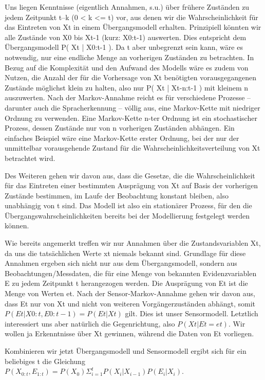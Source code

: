 Uns liegen Kenntnisse (eigentlich Annahmen, s.u.) über frühere Zuständen zu jedem Zeitpunkt t–k (0 < k <= t) vor, aus denen wir die Wahrscheinlichkeit für das Eintreten von Xt in einem Übergangsmodell erhalten.
Prinzipiell könnten wir alle Zustände von X0 bis Xt-1 (kurz: X0:t‑1) auswerten.
Dies entspricht dem Übergangsmodell P( Xt | X0:t-1 ).
Da t aber unbegrenzt sein kann, wäre es notwendig, nur eine endliche Menge an vorherigen Zuständen zu betrachten.
In Bezug auf die Komplexität und den Aufwand des Modells wäre es zudem von Nutzen, die Anzahl der für die Vorhersage von Xt benötigten vorausgegangenen Zustände möglichst klein zu halten, also nur P( Xt | Xt-n:t-1 ) mit kleinem n auszuwerten.
Nach der Markov-Annahme reicht es für verschiedene Prozesse – darunter auch die Spracherkennung – völlig aus, eine Markov-Kette mit niedriger Ordnung zu verwenden.
Eine Markov-Kette n-ter Ordnung ist ein stochastischer Prozess, dessen Zustände nur von n vorherigen Zuständen abhängen.
Ein einfaches Beispiel wäre eine Markov-Kette erster Ordnung, bei der nur der unmittelbar vorausgehende Zustand für die Wahrscheinlichkeitsverteilung von Xt betrachtet wird.


Des Weiteren gehen wir davon aus, dass die Gesetze, die die Wahrscheinlichkeit für das Eintreten einer bestimmten Ausprägung von Xt auf Basis der vorherigen Zustände bestimmen, im Laufe der Beobachtung konstant bleiben, also unabhängig von t sind.
Das Modell ist also ein stationärer Prozess, für den die Übergangswahrscheinlichkeiten bereits bei der Modellierung festgelegt werden können.

Wie bereits angemerkt treffen wir nur Annahmen über die Zustandsvariablen Xt, da uns die tatsächlichen Werte xt niemals bekannt sind.
Grundlage für diese Annahmen ergeben sich nicht nur aus dem Übergangsmodell, sondern aus Beobachtungen/Messdaten, die für eine Menge von bekannten Evidenzvariablen E zu jedem Zeitpunkt t herangezogen werden.
Die Ausprägung von Et ist die Menge von Werten et.
Nach der Sensor-Markov-Annahme gehen wir davon aus, dass Et nur von Xt und nicht von weiteren Vorgängerzuständen abhängt, somit $P( Et | X0:t, E0:t-1 ) = P( Et | Xt )$ gilt.
Dies ist unser Sensormodell.
Letztlich interessiert uns aber natürlich die Gegenrichtung, also $P( Xt | Et = et )$.
Wir wollen ja Erkenntnisse über Xt gewinnen, während die Daten von Et vorliegen.

Kombinieren wir jetzt Übergangsmodell und Sensormodell ergibt sich für ein beliebiges t die Gleichung $P(X_{0:t},E_{1:t}) = P(X_0) \Sigma_{i=1}^t P(X_i | X_{i-1}) P(E_i | X_i)$.


